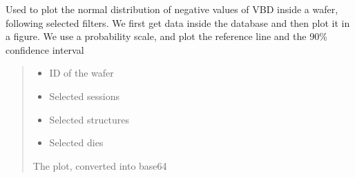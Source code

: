 \documentclass[letterpaper,10pt,english]{sphinxmanual}
\begin{document}
\begin{fulllineitems}
\label{\detokenize{normal_plots:normal_plots.VBD_normal_distrib_neg}}
\pysigstartsignatures
{}
\pysigstopsignatures
\sphinxAtStartPar
Used to plot the normal distribution of negative values of VBD inside a wafer, following selected filters.
We first get data inside the database and then plot it in a figure. We use a probability scale, and plot the reference line and the 90\% confidence interval
\begin{quote}\begin{description}
\begin{itemize}
\item {} 
\sphinxAtStartPar
{} \textendash{} ID of the wafer

\item {} 
\sphinxAtStartPar
{} \textendash{} Selected sessions

\item {} 
\sphinxAtStartPar
{} \textendash{} Selected structures

\item {} 
\sphinxAtStartPar
{} \textendash{} Selected dies

\end{itemize}

\sphinxAtStartPar
The plot, converted into base64

\end{description}\end{quote}

\end{fulllineitems}

\end{document}
